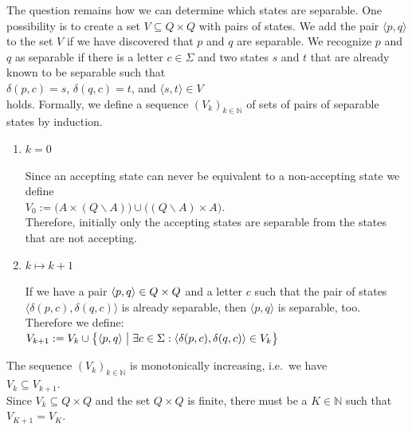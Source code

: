 The question remains how we can determine which states are separable.
One possibility is to create a set $V \subseteq Q \times Q$ with pairs of states.  We add the pair $\langle p, q \rangle$ to the set
$V$ if we have discovered that $p$ and $q$ are separable.  We recognize $p$ and $q$ as separable if
there is a letter $c\in\Sigma$ and two states $s$ and $t$ that are already known to be separable such that 
\\[0.2cm]
\hspace*{1.3cm}
$\delta(p,c) = s$, \quad $\delta(q,c) = t$, \quad and \quad $\langle s, t \rangle \in V$
\\[0.2cm]
holds.  Formally, we define a sequence $(V_k)_{k\in\mathbb{N}}$ of sets of pairs of separable states by
induction.
\begin{enumerate}
\item[I.A.:] $k=0$

     Since an accepting state can never be equivalent to a non-accepting state we define
     \\[0.2cm]
     \hspace*{1.3cm}
     $V_0 := \bigl(A \times (Q \backslash A)\bigr) \cup \bigl((Q \backslash A) \times A\bigr)$.
     \\[0.2cm]
     Therefore, initially only the accepting states are separable from the states that are not accepting.
\item[I.S.:] $k \mapsto k + 1$

     If we have a pair $\pair(p,q) \in Q \times Q$ and a letter $c$ such that 
     the pair of states  $\langle \delta(p,c), \delta(q,c) \rangle$ is already separable, then $\langle p, q \rangle$ is
     separable, too.  Therefore we define:  
     \\[0.2cm]
     \hspace*{1.3cm}
     $V_{k+1} := V_k \cup \bigl\{ \pair(p,q) \bigm| \exists c \in \Sigma: \langle \delta(p,c), \delta(q,c) \rangle \in V_k \bigr\}$
\end{enumerate}
The sequence $(V_k)_{k\in\mathbb{N}}$ is monotonically increasing, i.e.~we have
\\[0.2cm]
\hspace*{1.3cm}
$V_{k} \subseteq V_{k+1}$.
\\[0.2cm]
Since $V_k \subseteq Q \times Q$ and the set $Q \times Q$ is finite, there must be a $K \in \mathbb{N}$ such that
\\[0.2cm]
\hspace*{1.3cm}
$V_{K+1} = V_K$.
\\[0.2cm]
